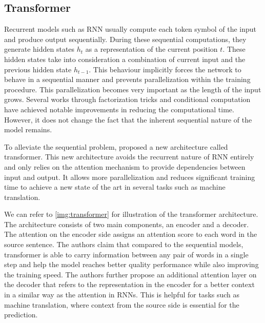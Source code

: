 \subsection{Transformer}
Recurrent models such as RNN usually compute each token symbol of the input and produce output sequentially. During these sequential computations, they generate hidden states $h_t$ as a representation of the current position $t$. These hidden states take into consideration a combination of current input and the previous hidden state $h_{t-1}$. This behaviour implicitly forces the network to behave in a sequential manner and prevents parallelization within the training procedure. This parallelization becomes very important as the length of the input grows. Several works through factorization tricks  and conditional computation  have achieved notable improvements in reducing the computational time. However, it does not change the fact that the inherent sequential nature of the model remains.

To alleviate the sequential problem,  proposed a new architecture called transformer. This new architecture avoids the recurrent nature of RNN entirely and only relies on the attention mechanism to provide dependencies between input and output. It allows more parallelization and reduces significant training time to achieve a new state of the art in several tasks such as machine translation.

We can refer to \cref{img:transformer} for illustration of the transformer architecture. The architecture consists of two main components, an encoder and a decoder. The attention on the encoder side assigns an attention score to each word in the source sentence. The authors claim that compared to the sequential models, transformer is able to carry information between any pair of words in a single step and help the model reaches better quality performance while also improving the training speed. The authors further propose an additional attention layer on the decoder that refers to the representation in the encoder for a better context in a similar way as the attention in RNNs. This is helpful for tasks such as machine translation, where context from the source side is essential for the prediction.

